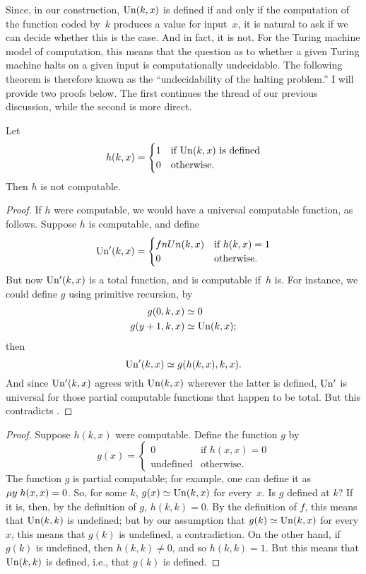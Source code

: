 \documentclass[../../include/open-logic-section]{subfiles}
\begin{document}

Since, in our construction, $\mathrm{Un}(k,x)$ is defined if and only if
the computation of the function coded by~$k$ produces a value for
input~$x$, it is natural to ask if we can decide whether this is the
case.  And in fact, it is not.  For the Turing machine model of
computation, this means that the question as to whether a given Turing
machine halts on a given input is computationally undecidable. The
following theorem is therefore known as the ``undecidability of the
halting problem.'' I will provide two proofs below. The first
continues the thread of our previous discussion, while the second is
more direct.

\begin{thm}
Let
\[
h(k, x)  = 
\begin{cases}
1 & \text{if $\fn{Un}(k,x)$ is defined} \\
0 & \text{otherwise.}
\end{cases}
\]
Then $h$ is not computable.
\end{thm}

\begin{proof}
If $h$ were computable, we would have a universal computable function,
as follows. Suppose $h$ is computable, and define
\[
\fn{Un'}(k,x) = 
\begin{cases}
fn{Un}(k,x) & \text{if $h(k,x) = 1$} \\
0 & \text{otherwise.}
\end{cases}
\]
But now $\mathrm{Un'}(k, x)$ is a total function, and is computable if~$h$
is.  For instance, we could define $g$ using primitive recursion, by
\begin{align*}
g(0, k, x) & \simeq 0 \\
g(y+1, k, x) & \simeq \fn{Un}(k,x);
\end{align*} 
then 
\[
\mathrm{Un'}(k,x) \simeq g(h(k,x),k,x).
\]
And since $\mathrm{Un'}(k,x)$ agrees with $\mathrm{Un}(k,x)$ wherever the
latter is defined, $\mathrm{Un'}$ is universal for those partial
computable functions that happen to be total.  But this contradicts
.
\end{proof}

\begin{proof}
Suppose $h(k,x)$ were computable. Define the function $g$ by
\[
g(x) = 
\begin{cases}
  0                & \text{if $h(x,x) = 0$} \\
  \text{undefined} & \text{otherwise.}
\end{cases}
\]
The function $g$ is partial computable; for example, one can define it
as $\mu y \; h(x,x) = 0$. So, for some $k$, $g(x) \simeq \mathrm{Un}(k, x)$ for
every~$x$. Is $g$ defined at $k$?  If it is, then, by the definition
of $g$, $h(k,k) = 0$. By the definition of $f$, this means that
$\mathrm{Un}(k, k)$ is undefined; but by our assumption that $g(k) \simeq
\mathrm{Un}(k, x)$ for every $x$, this means that $g(k)$ is undefined, a
contradiction. On the other hand, if $g(k)$ is undefined, then $h(k,k)
\neq 0$, and so $h(k,k) = 1$. But this means that $\mathrm{Un}(k, k)$ is
defined, i.e., that $g(k)$ is defined. 
\end{proof}
\end{document}
